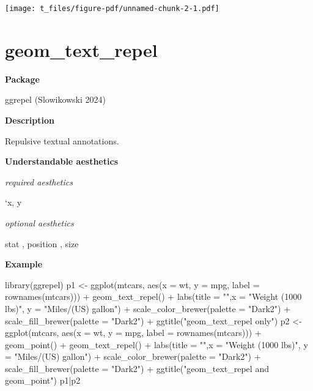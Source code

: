 \documentclass[
  letterpaper,
  DIV=11,
  numbers=noendperiod]{scrreprt}
\newenvironment{Shaded}{\begin{snugshade}}{\end{snugshade}}
\newcommand{\AttributeTok}[1]{\textcolor[rgb]{0.40,0.45,0.13}{#1}}
\newcommand{\FunctionTok}[1]{\textcolor[rgb]{0.28,0.35,0.67}{#1}}
\newcommand{\NormalTok}[1]{\textcolor[rgb]{0.00,0.23,0.31}{#1}}
\newcommand{\OtherTok}[1]{\textcolor[rgb]{0.00,0.23,0.31}{#1}}
\newcommand{\SpecialCharTok}[1]{\textcolor[rgb]{0.37,0.37,0.37}{#1}}
\newcommand{\StringTok}[1]{\textcolor[rgb]{0.13,0.47,0.30}{#1}}
\begin{document}
\texttt{[image: t\_files/figure-pdf/unnamed-chunk-2-1.pdf]}

\section{geom\_text\_repel}\label{text_repel}

\textbf{Package}

ggrepel (Slowikowski 2024)

\textbf{Description}

Repulsive textual annotations.

\textbf{Understandable aesthetics}

\emph{required aesthetics}

`x, y

\emph{optional aesthetics}

stat , position , size

\textbf{Example}

\begin{Shaded}
\begin{Highlighting}[]
\FunctionTok{library}\NormalTok{(ggrepel)}
\NormalTok{p1 }\OtherTok{\textless{}{-}} \FunctionTok{ggplot}\NormalTok{(mtcars, }\FunctionTok{aes}\NormalTok{(}\AttributeTok{x =}\NormalTok{ wt, }\AttributeTok{y =}\NormalTok{ mpg, }\AttributeTok{label =} \FunctionTok{rownames}\NormalTok{(mtcars))) }\SpecialCharTok{+}
  \FunctionTok{geom\_text\_repel}\NormalTok{() }\SpecialCharTok{+}  
  \FunctionTok{labs}\NormalTok{(}\AttributeTok{title =} \StringTok{""}\NormalTok{,}\AttributeTok{x =} \StringTok{"Weight (1000 lbs)"}\NormalTok{, }\AttributeTok{y =} \StringTok{"Miles/(US) gallon"}\NormalTok{) }\SpecialCharTok{+} \FunctionTok{scale\_color\_brewer}\NormalTok{(}\AttributeTok{palette =} \StringTok{"Dark2"}\NormalTok{) }\SpecialCharTok{+} \FunctionTok{scale\_fill\_brewer}\NormalTok{(}\AttributeTok{palette =} \StringTok{"Dark2"}\NormalTok{) }\SpecialCharTok{+} \FunctionTok{ggtitle}\NormalTok{(}\StringTok{"geom\_text\_repel only"}\NormalTok{)}
\NormalTok{p2 }\OtherTok{\textless{}{-}} \FunctionTok{ggplot}\NormalTok{(mtcars, }\FunctionTok{aes}\NormalTok{(}\AttributeTok{x =}\NormalTok{ wt, }\AttributeTok{y =}\NormalTok{ mpg, }\AttributeTok{label =} \FunctionTok{rownames}\NormalTok{(mtcars))) }\SpecialCharTok{+}
  \FunctionTok{geom\_point}\NormalTok{() }\SpecialCharTok{+}
  \FunctionTok{geom\_text\_repel}\NormalTok{() }\SpecialCharTok{+}  
  \FunctionTok{labs}\NormalTok{(}\AttributeTok{title =} \StringTok{""}\NormalTok{,}\AttributeTok{x =} \StringTok{"Weight (1000 lbs)"}\NormalTok{, }\AttributeTok{y =} \StringTok{"Miles/(US) gallon"}\NormalTok{) }\SpecialCharTok{+} \FunctionTok{scale\_color\_brewer}\NormalTok{(}\AttributeTok{palette =} \StringTok{"Dark2"}\NormalTok{) }\SpecialCharTok{+} \FunctionTok{scale\_fill\_brewer}\NormalTok{(}\AttributeTok{palette =} \StringTok{"Dark2"}\NormalTok{) }\SpecialCharTok{+} \FunctionTok{ggtitle}\NormalTok{(}\StringTok{"geom\_text\_repel and geom\_point"}\NormalTok{)}
\NormalTok{p1}\SpecialCharTok{|}\NormalTok{p2}
\end{Highlighting}
\end{Shaded}
\end{document}
